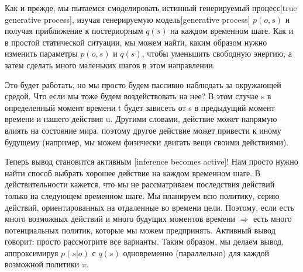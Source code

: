 \documentclass[twoside,leqno, 11pt]{article}
\begin{document}
	Как и прежде, мы пытаемся смоделировать истинный генерируемый процесс[true generative process], изучая генерируемую модель[generative process] $p(o,s)$ и получая приближение к постериорным $q(s)$ на каждом временном шаге. Как и в простой статической ситуации, мы можем найти, каким образом нужно изменить параметры $p(o,s)$ и $q(s)$, чтобы уменьшить свободную энергию, а затем сделать много маленьких шагов в этом направлении.

	\begin{figure}[h]	
		\label{ris:image}
	\end{figure}
	
	Это будет работать, но мы просто будем пассивно наблюдать за окружающей средой. Что если мы тоже будем воздействовать на нее? В этом случае s в определенный момент времени t будет зависеть от s в предыдущий момент времени и нашего действия u. Другими словами, действие может напрямую влиять на состояние мира, поэтому другое действие может привести к иному будущему (например, мы можем физически двигать вещи своими действиями).

	\begin{figure}[h]	
		\label{ris:image}
	\end{figure}
	
	Теперь вывод становится активным [inference becomes active]! Нам просто нужно найти способ выбрать хорошее действие на каждом временном шаге. В действительности кажется, что мы не рассматриваем последствия действий только на следующем временном шаге. Мы планируем всю политику, серию действий, ориентированных на отдаленные во времени цели. Поэтому, если есть много возможных действий и много будущих моментов времени $\Rightarrow$ есть много потенциальных политик, которые мы можем предпринять. Активный вывод говорит: просто рассмотрите все варианты. Таким образом, мы делаем вывод, аппроксимируя $p(s|o)$ с $q(s)$ одновременно (параллельно) для каждой возможной политики $\pi$.
\end{document}
